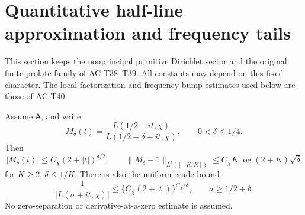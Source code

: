 \section{Quantitative half-line approximation and frequency tails}

This section keeps the nonprincipal primitive Dirichlet sector
and the original finite prolate family of AC-T38--T39.
All constants may depend on this fixed character.
The local factorization and frequency bump estimates used below
are those of AC-T40.

\begin{lemma}
\label{AC-T41-ratio}
Assume \(\mathsf A\), and write
\[
 M_\delta(t)=
  \frac{L(1/2+it,\chi)}{L(1/2+\delta+it,\chi)},
                         \qquad 0<\delta\leq1/4.
 \tag{TT.1}
\]
Then
\[
 |M_\delta(t)|\leq C_\chi(2+|t|)^{\delta/2},
 \qquad
 \|M_\delta-1\|_{L^2([-K,K])}
       \leq C_\chi K\log(2+K)\sqrt\delta
 \tag{TT.2}
\]
for \(K\geq2\), \(\delta\leq1/K\).
There is also the uniform crude bound
\[
 \frac1{|L(\sigma+it,\chi)|}
       \leq \{C_\chi(2+|t|)\}^{C_\chi/\delta},
                  \qquad \sigma\geq1/2+\delta.
 \tag{TT.3}
\]
No zero-separation or derivative-at-a-zero estimate is assumed.
\end{lemma}
